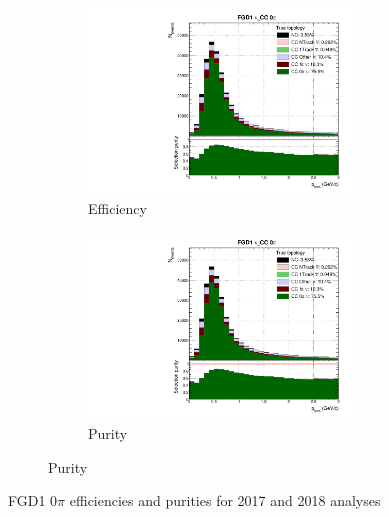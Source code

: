 \begin{figure}[h]
	\begin{subfigure}[t]{\textwidth}
		\centering
		\caption*{2017 analysis}
	\begin{subfigure}[t]{0.4\textwidth}
	\includegraphics[width=\textwidth,page=1, trim={0mm 0mm 0mm 9mm}, clip]{figures/mach3/selection/2017b_Diag_WithSelection}
	\caption{Efficiency}
\end{subfigure}
\begin{subfigure}[t]{0.4\textwidth}
	\includegraphics[width=\textwidth,page=2, trim={0mm 0mm 0mm 9mm}, clip]{figures/mach3/selection/2017b_Diag_WithSelection}
	\caption{Purity}
\end{subfigure}
\end{subfigure}
\caption{FGD1 0$\pi$ efficiencies and purities for 2017 and 2018 analyses}
\label{fig:fgd1_cc0pi_eff_2017_2018}
\end{figure}

